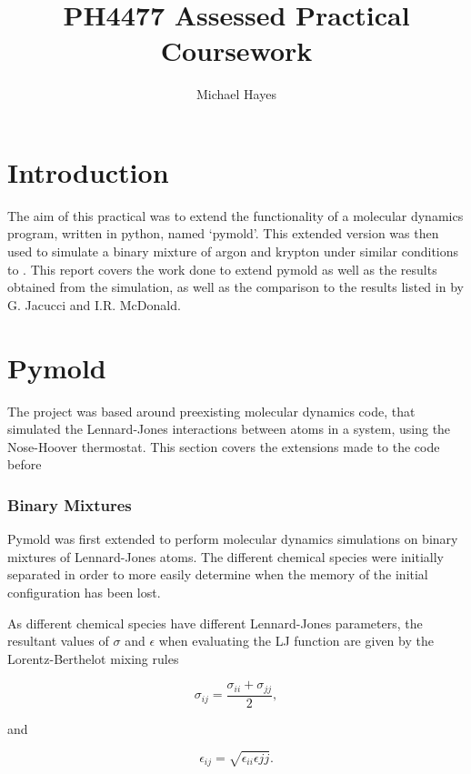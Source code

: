 \documentclass{article}
\title{PH4477 Assessed Practical Coursework}
\author{Michael Hayes}
\begin{document}
\maketitle
\large
\onehalfspacing

\section{Introduction}

The aim of this practical was to extend the functionality of a molecular dynamics program, written in python, named `pymold'. This extended version was then used to simulate a binary mixture of argon and krypton under similar conditions to \cite{StructureAndDiffusion}. This report covers the work done to extend pymold as well as the results obtained from the simulation, as well as the comparison to the results listed in \cite{StructureAndDiffusion} by G. Jacucci and I.R. McDonald.

\section{Pymold}
The project was based around preexisting molecular dynamics code, that simulated the Lennard-Jones interactions between atoms in a system, using the Nose-Hoover thermostat. This section covers the extensions made to the code before 

\subsubsection{Binary Mixtures}
Pymold was first extended to perform molecular dynamics simulations on binary mixtures of Lennard-Jones atoms. The different chemical species were initially separated in order to more easily determine when the memory of the initial configuration has been lost.

As different chemical species have different Lennard-Jones parameters, the resultant values of $\sigma$ and $\epsilon$ when evaluating the LJ function are given by the Lorentz-Berthelot mixing rules

\begin{equation}
\sigma_{ij} = \frac{\sigma_{ii} + \sigma_{jj}}{2},
\end{equation}

and

\begin{equation}
\epsilon_{ij} = \sqrt{\epsilon_{ii}\epsilon{jj}}.
\end{equation}
\end{document}
